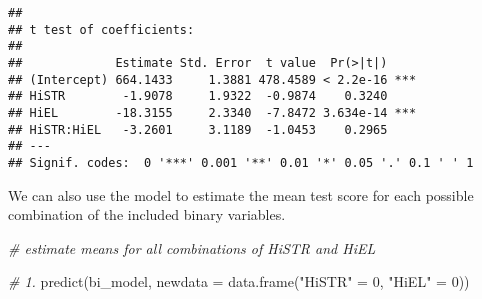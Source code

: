 \documentclass[
]{article}
\newenvironment{Shaded}{\begin{snugshade}}{\end{snugshade}}
\newcommand{\AttributeTok}[1]{\textcolor[rgb]{0.77,0.63,0.00}{#1}}
\newcommand{\CommentTok}[1]{\textcolor[rgb]{0.56,0.35,0.01}{\textit{#1}}}
\newcommand{\DecValTok}[1]{\textcolor[rgb]{0.00,0.00,0.81}{#1}}
\newcommand{\FunctionTok}[1]{\textcolor[rgb]{0.00,0.00,0.00}{#1}}
\newcommand{\NormalTok}[1]{#1}
\newcommand{\OtherTok}[1]{\textcolor[rgb]{0.56,0.35,0.01}{#1}}
\newcommand{\SpecialCharTok}[1]{\textcolor[rgb]{0.00,0.00,0.00}{#1}}
\newcommand{\StringTok}[1]{\textcolor[rgb]{0.31,0.60,0.02}{#1}}
\begin{document}
\begin{Shaded}
\end{Shaded}

\begin{verbatim}
## 
## t test of coefficients:
## 
##             Estimate Std. Error  t value  Pr(>|t|)    
## (Intercept) 664.1433     1.3881 478.4589 < 2.2e-16 ***
## HiSTR        -1.9078     1.9322  -0.9874    0.3240    
## HiEL        -18.3155     2.3340  -7.8472 3.634e-14 ***
## HiSTR:HiEL   -3.2601     3.1189  -1.0453    0.2965    
## ---
## Signif. codes:  0 '***' 0.001 '**' 0.01 '*' 0.05 '.' 0.1 ' ' 1
\end{verbatim}

We can also use the model to estimate the mean test score for each
possible combination of the included binary variables.

\begin{Shaded}
\begin{Highlighting}[]
\CommentTok{\# estimate means for all combinations of HiSTR and HiEL}

\CommentTok{\# 1.}
\FunctionTok{predict}\NormalTok{(bi\_model, }\AttributeTok{newdata =} \FunctionTok{data.frame}\NormalTok{(}\StringTok{"HiSTR"} \OtherTok{=} \DecValTok{0}\NormalTok{, }\StringTok{"HiEL"} \OtherTok{=} \DecValTok{0}\NormalTok{))}
\end{Highlighting}
\end{Shaded}
\end{document}
